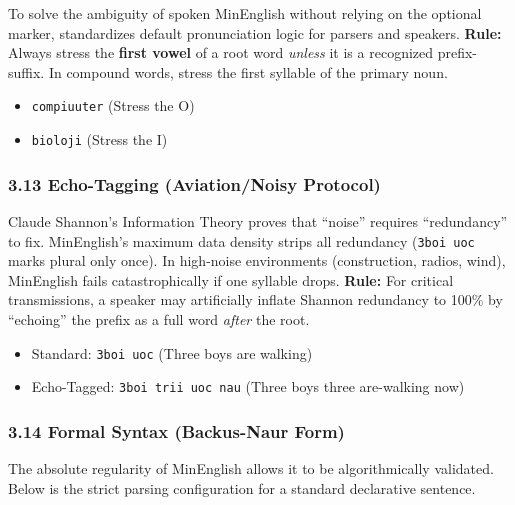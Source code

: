 To solve the ambiguity of spoken MinEnglish without relying on the
optional \texttt{\textquotesingle{}} marker, standardizes default
pronunciation logic for parsers and speakers. \textbf{Rule:} Always
stress the \textbf{first vowel} of a root word \emph{unless} it is a
recognized prefix-suffix. In compound words, stress the first syllable
of the primary noun.

\begin{itemize}
\tightlist
\item
  \texttt{c\textquotesingle{}ompiuuter} (Stress the O)
\item
  \texttt{b\textquotesingle{}ioloji} (Stress the I)
\end{itemize}

\subsubsection{3.13 Echo-Tagging (Aviation/Noisy
Protocol)}\label{echo-tagging-aviationnoisy-protocol}

Claude Shannon's Information Theory proves that ``noise'' requires
``redundancy'' to fix. MinEnglish's maximum data density strips all
redundancy (\texttt{3boi\ uoc} marks plural only once). In high-noise
environments (construction, radios, wind), MinEnglish fails
catastrophically if one syllable drops. \textbf{Rule:} For critical
transmissions, a speaker may artificially inflate Shannon redundancy to
100\% by ``echoing'' the prefix as a full word \emph{after} the root.

\begin{itemize}
\tightlist
\item
  Standard: \texttt{3boi\ uoc} (Three boys are walking)
\item
  Echo-Tagged: \texttt{3boi\ trii\ uoc\ nau} (Three boys three
  are-walking now)
\end{itemize}

\subsubsection{3.14 Formal Syntax (Backus-Naur
Form)}\label{formal-syntax-backus-naur-form}

The absolute regularity of MinEnglish allows it to be algorithmically
validated. Below is the strict parsing configuration for a standard
declarative sentence.


